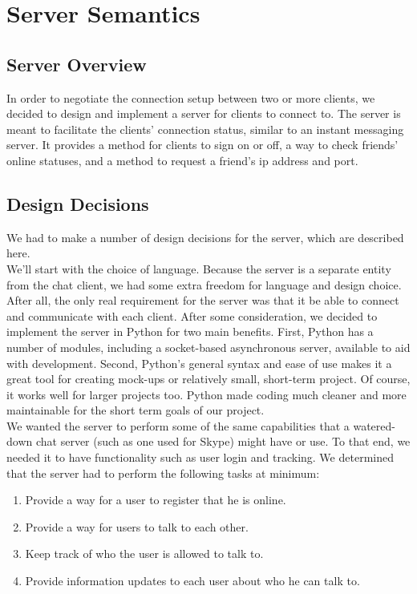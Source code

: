 \documentclass[9pt,twocolumn]{article}
\begin{document}
\section{Server Semantics}

\subsection{Server Overview}

In order to negotiate the connection setup between two or more clients, we decided to
design and implement a server for clients to connect to. The server is meant to
facilitate the clients' connection status, similar to an instant messaging server. It
provides a method for clients to sign on or off, a way to check friends' online
statuses, and a method to request a friend's ip address and port.

\subsection{Design Decisions}

We had to make a number of design decisions for the server, which are described here.\\

We'll start with the choice of language. Because the server is a separate entity from
the chat client, we had some extra freedom for language and design choice. After all,
the only real requirement for the server was that it be able to connect and communicate
with each client. After some consideration, we decided to implement the server in
Python for two main benefits. First, Python has a number of modules, including a 
socket-based asynchronous server, available to aid with development. Second, Python's
general syntax and ease of use makes it a great tool for creating mock-ups or
relatively small, short-term project. Of course, it works well for larger projects too.
Python made coding much cleaner and more maintainable for the short term goals of our
project.\\

We wanted the server to perform some of the same capabilities that a watered-down chat
server (such as one used for Skype) might have or use. To that end, we needed it to
have functionality such as user login and tracking. We determined that the server
had to perform the following tasks at minimum:
\begin{enumerate}
  \item Provide a way for a user to register that he is online.
  \item Provide a way for users to talk to each other.
  \item Keep track of who the user is allowed to talk to.
  \item Provide information updates to each user about who he can talk to.
\end{enumerate}
\end{document}
